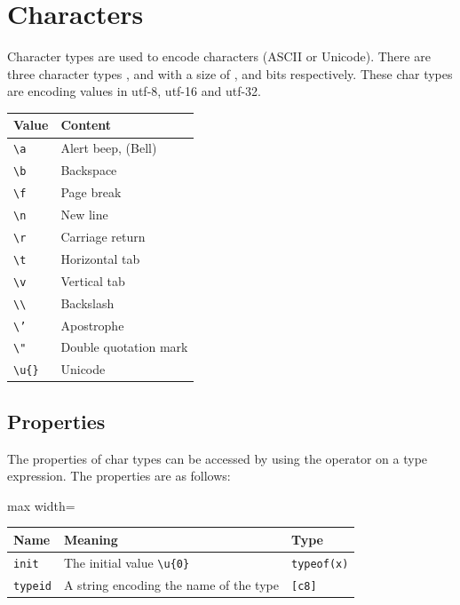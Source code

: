 \section{Characters}
\label{sec:char_type}

Character types are used to encode characters (ASCII or Unicode). There are
three character types ,  and  with a size of
,  and  bits respectively. These char types are
encoding values in utf-8, utf-16 and utf-32.

\begin{center}
  \begin{tabular}{ll}
    Value & Content\\[0pt]
    \hline
    \texttt{\textbackslash{}a} & Alert beep, (Bell)\\[0pt]
    \texttt{\textbackslash{}b} & Backspace\\[0pt]
    \texttt{\textbackslash{}f} & Page break\\[0pt]
    \texttt{\textbackslash{}n} & New line\\[0pt]
    \texttt{\textbackslash{}r} & Carriage return\\[0pt]
    \texttt{\textbackslash{}t} & Horizontal tab\\[0pt]
    \texttt{\textbackslash{}v} & Vertical tab\\[0pt]
    \texttt{\textbackslash{}\textbackslash{}} & Backslash\\[0pt]
    \texttt{\textbackslash{}'} & Apostrophe\\[0pt]
    \texttt{\textbackslash{}"} & Double quotation mark\\[0pt]
    \texttt{\textbackslash{}u\{\}} & Unicode\\[0pt]
  \end{tabular}
\end{center}

\subsection{Properties}
\label{sec:orgf9fbc31}

The properties of char types can be accessed by using the \token{::} operator
on a type expression. The properties are as follows:

\begin{center}
  \begin{adjustbox}{max width=\linewidth}
    \begin{tabular}{|l|ll|}
      \hline
      Name & Meaning & Type\\[0pt]
      \hline
      \hline
      \texttt{init} & The initial value \texttt{\textbackslash{}u\{0\}} & \texttt{typeof(x)}\\[0pt]
      \hline
      \texttt{typeid} & A string encoding the name of the type & \texttt{[c8]}\\[0pt]
      \hline
    \end{tabular}
  \end{adjustbox}
\end{center}


